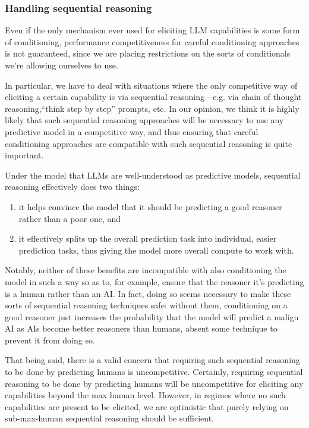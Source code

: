 \documentclass[
  onecolumn,
  natbib,
]{miri-tech-article}
\begin{document}
\subsubsection{Handling sequential reasoning}\label{subsubsec:handling_sequential_reasoning}

Even if the only mechanism ever used for eliciting LLM capabilities is some form of conditioning, performance competitiveness for careful conditioning approaches is not guaranteed, since we are placing restrictions on the sorts of conditionals we're allowing ourselves to use.

In particular, we have to deal with situations where the only competitive way of eliciting a certain capability is via sequential reasoning---e.g. via chain of thought reasoning,``think step by step\cite{kojima_large_2023}'' prompts, etc. In our opinion, we think it is highly likely that such sequential reasoning approaches will be necessary to use any predictive model in a competitive way, and thus ensuring that careful conditioning approaches are compatible with such sequential reasoning is quite important.

Under the model that LLMs are well-understood as predictive models, sequential reasoning effectively does two things:



\begin{enumerate}
\item it helps convince the model that it should be predicting a good reasoner rather than a poor one, and
\item it effectively splits up the overall prediction task into individual, easier prediction tasks, thus giving the model more overall compute to work with.
\end{enumerate}

Notably, neither of these benefits are incompatible with also conditioning the model in such a way so as to, for example, ensure that the reasoner it's predicting is a human rather than an AI. In fact, doing so seems necessary to make these sorts of sequential reasoning techniques safe: without them, conditioning on a good reasoner just increases the probability that the model will predict a malign AI as AIs become better reasoners than humans, absent some technique to prevent it from doing so.

That being said, there is a valid concern that requiring such sequential reasoning to be done by predicting humans is uncompetitive. Certainly, requiring sequential reasoning to be done by predicting humans will be uncompetitive for eliciting any capabilities beyond the max human level. However, in regimes where no such capabilities are present to be elicited, we are optimistic that purely relying on sub-max-human sequential reasoning should be sufficient.
\end{document}

